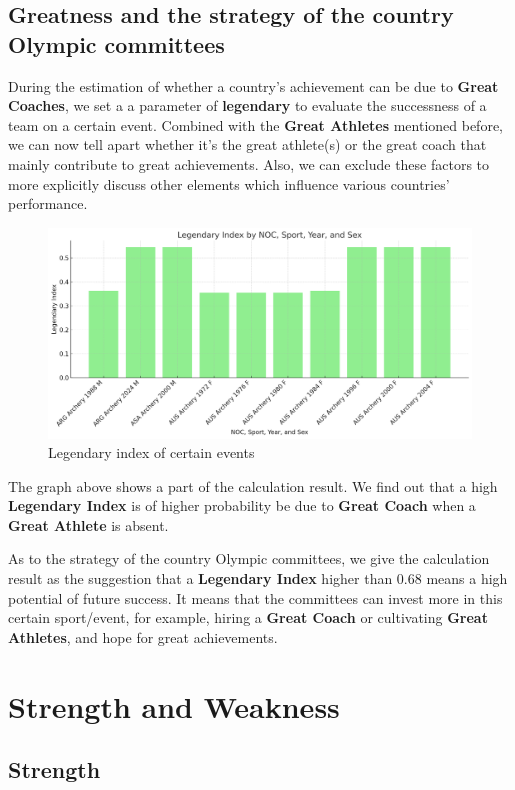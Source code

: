 \subsection{Greatness and the strategy of the country Olympic committees}
During the estimation of whether a country's achievement can be due to \textbf{Great Coaches}, we set a a parameter of \textbf{legendary} to evaluate the successness of a team on a certain event.
Combined with the \textbf{Great Athletes} mentioned before, we can now tell apart whether it's the great athlete(s) or the great coach that mainly contribute to great achievements.
Also, we can exclude these factors to more explicitly discuss other elements which influence various countries' performance.
\begin{figure}[h]
    \centering
    \includegraphics[width=1\textwidth]{./figures/Legendary_index.png}
    \caption{Legendary index of certain events}
    \label{fig:legendary_index}
    \end{figure}
The graph above shows a part of the calculation result. We find out that a high \textbf{Legendary Index} is of higher probability be due to \textbf{Great Coach} when a \textbf{Great Athlete} is absent.

As to the strategy of the country Olympic committees, we give the calculation result as the suggestion that a \textbf{Legendary Index} higher than 0.68 means a high potential of future success.
It means that the committees can invest more in this certain sport/event, for example, hiring a \textbf{Great Coach} or cultivating \textbf{Great Athletes}, and hope for great achievements.
\section{Strength and Weakness}

\subsection{Strength}


